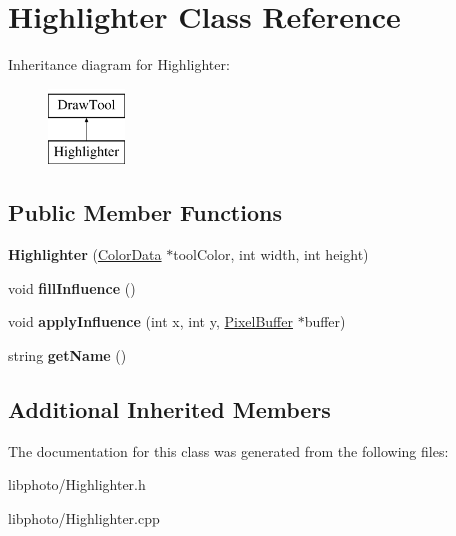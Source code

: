 \hypertarget{classHighlighter}{\section{Highlighter Class Reference}
\label{classHighlighter}
}
Inheritance diagram for Highlighter\-:\begin{figure}[H]
\begin{center}
\leavevmode
\includegraphics[height=2.000000cm]{classHighlighter}
\end{center}
\end{figure}
\subsection*{Public Member Functions}
\begin{DoxyCompactItemize}
\item 
\hypertarget{classHighlighter_aec9c28167c01f98e3da6eb38e64e6c67}{{\bfseries Highlighter} (\hyperlink{classColorData}{Color\-Data} $\ast$tool\-Color, int width, int height)}\label{classHighlighter_aec9c28167c01f98e3da6eb38e64e6c67}

\item 
\hypertarget{classHighlighter_ab2d858cc3fbddace3f64688293cad8e1}{void {\bfseries fill\-Influence} ()}\label{classHighlighter_ab2d858cc3fbddace3f64688293cad8e1}

\item 
\hypertarget{classHighlighter_a28e750d99d9aa85521427001ef73be0d}{void {\bfseries apply\-Influence} (int x, int y, \hyperlink{classPixelBuffer}{Pixel\-Buffer} $\ast$buffer)}\label{classHighlighter_a28e750d99d9aa85521427001ef73be0d}

\item 
\hypertarget{classHighlighter_aab9bc271db3cc23737e7604a9ab29211}{string {\bfseries get\-Name} ()}\label{classHighlighter_aab9bc271db3cc23737e7604a9ab29211}

\end{DoxyCompactItemize}
\subsection*{Additional Inherited Members}


The documentation for this class was generated from the following files\-:\begin{DoxyCompactItemize}
\item 
libphoto/Highlighter.\-h\item 
libphoto/Highlighter.\-cpp\end{DoxyCompactItemize}
